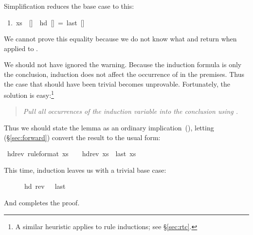 \begin{isabellebody}
\begin{isamarkuptxt}
\begin{isabelle}
\end{isabelle}
Simplification reduces the base case to this:
\begin{isabelle}
\ 1.\ xs\ {\isasymnoteq}\ []\ {\isasymLongrightarrow}\ hd\ []\ =\ last\ []
\end{isabelle}
We cannot prove this equality because we do not know what  and
 return when applied to .

We should not have ignored the warning. Because the induction
formula is only the conclusion, induction does not affect the occurrence of  in the premises.  
Thus the case that should have been trivial
becomes unprovable. Fortunately, the solution is easy:\footnote{A similar
heuristic applies to rule inductions; see \S\ref{sec:rtc}.}
\begin{quote}
\emph{Pull all occurrences of the induction variable into the conclusion
using .}
\end{quote}
Thus we should state the lemma as an ordinary 
implication~(), letting
 (\S\ref{sec:forward}) convert the
result to the usual  form:%
\end{isamarkuptxt}%
\isamarkuptrue%
%
\endisatagproof
{\isafoldproof}%
%
\isadelimproof
%
\endisadelimproof
{}\isamarkupfalse%
\ hd{}rev\ {}rule{}format{}{}\ {}xs\ {}\ {}{}\ {}\ hd{}rev\ xs{}\ {}\ last\ xs{}%
\isadelimproof
%
\endisadelimproof
%
\isatagproof
%
\begin{isamarkuptxt}%
\noindent
This time, induction leaves us with a trivial base case:
\begin{isabelle}%
\ {}{}\ {}{}\ {}\ {}{}\ {}\ hd\ {}rev\ {}{}{}\ {}\ last\ {}{}%
\end{isabelle}
And  completes the proof.


\end{isamarkuptxt}
\end{isabellebody}
